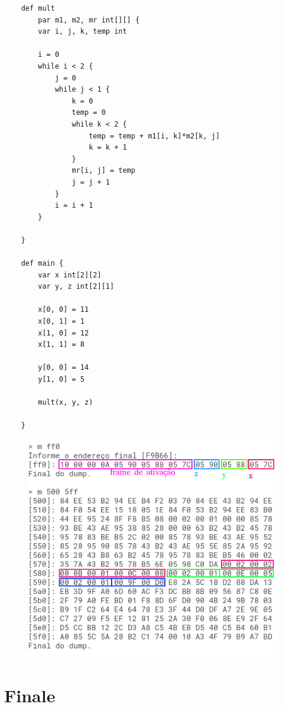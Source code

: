 \documentclass[a4paper,12pt]{report}
\begin{document}
    \begin{lstlisting}
    def mult
        par m1, m2, mr int[][] {
        var i, j, k, temp int

        i = 0
        while i < 2 {
            j = 0
            while j < 1 {
                k = 0
                temp = 0
                while k < 2 {
                    temp = temp + m1[i, k]*m2[k, j]
                    k = k + 1
                }
                mr[i, j] = temp
                j = j + 1
            }
            i = i + 1
        }

    }

    def main {
        var x int[2][2]
        var y, z int[2][1]

        x[0, 0] = 11
        x[0, 1] = 1
        x[1, 0] = 12
        x[1, 1] = 8

        y[0, 0] = 14
        y[1, 0] = 5

        mult(x, y, z)

    }
    \end{lstlisting}

    \begin{figure}[h]
        \centering
        \includegraphics[scale=0.65]{mult}
    \end{figure}

    \chapter*{Finale}
\end{document}
